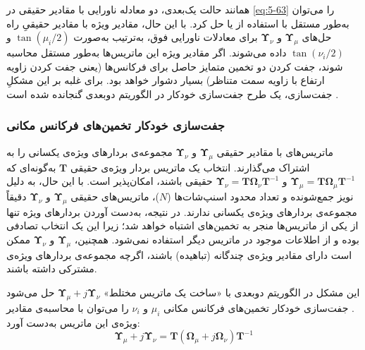 همانند حالت یک‌بعدی، دو معادله ناورایی با مقادیر حقیقی در \eqref{eq:5-63} را می‌توان به‌طور مستقل با استفاده از  یا  حل کرد. با این حال، مقادیر ویژه با مقادیر حقیقیِ راه حل‌های $\bm{\Upsilon}_{\mu}$ و $\bm{\Upsilon}_{\nu}$ برای معادلات ناورایی فوق، به‌ترتیب به‌صورت $\tan(\mu_i/2)$ و $\tan(\nu_i/2)$ داده می‌شوند. اگر مقادیر ویژه این ماتریس‌ها به‌طور مستقل محاسبه شوند، جفت کردن دو تخمین متمایز حاصل برای فرکانس‌ها (یعنی جفت کردن زاویه ارتفاع با زاویه سمت متناظر) بسیار دشوار خواهد بود. برای غلبه بر این مشکلِ جفت‌سازی، یک طرح جفت‌سازی خودکار در الگوریتم  دوبعدی گنجانده شده است \cite{5-9}.




\subsubsection{جفت‌سازی خودکار تخمین‌های فرکانس مکانی}
\label{subsubsec:5-5-2-4}
ماتریس‌های با مقادیر حقیقی $\bm{\Upsilon}_{\mu}$ و $\bm{\Upsilon}_{\nu}$ مجموعه‌ی بردارهای ویژه‌ی یکسانی را به اشتراک می‌گذارند. انتخاب یک ماتریس بردار ویژه‌ی حقیقی $\bm{T}$ به‌گونه‌ای که $\bm{\Upsilon}_{\mu} = \bm{T} \bm{\Omega}_{\mu} \bm{T}^{-1}$ و $\bm{\Upsilon}_{\nu} = \bm{T} \bm{\Omega}_{\nu} \bm{T}^{-1}$ حقیقی باشند، امکان‌پذیر است. با این حال، به دلیل نویز جمع‌شونده و تعداد محدود اسنپ‌شات‌ها ($N$)، ماتریس‌های حقیقی $\bm{\Upsilon}_{\mu}$ و $\bm{\Upsilon}_{\nu}$ دقیقاً مجموعه‌ی بردارهای ویژه‌ی یکسانی ندارند. در نتیجه، به‌دست آوردن بردارهای ویژه تنها از یکی از ماتریس‌ها منجر به تخمین‌های اشتباه خواهد شد؛ زیرا این یک انتخاب تصادفی بوده و از اطلاعات موجود در ماتریس دیگر استفاده نمی‌شود. همچنین، $\bm{\Upsilon}_{\mu}$ و $\bm{\Upsilon}_{\nu}$ ممکن است دارای مقادیر ویژه‌ی چندگانه (تباهیده) باشند، اگرچه مجموعه‌ی بردارهای ویژه‌ی مشترکی داشته باشند.

این مشکل در الگوریتم  دوبعدی با «ساخت یک ماتریس مختلط» $\bm{\Upsilon}_{\mu} + j \bm{\Upsilon}_{\nu}$ حل می‌شود \cite{5-9}. جفت‌سازی خودکار تخمین‌های فرکانس مکانی $\mu_i$ و $\nu_i$ را می‌توان با محاسبه‌ی مقادیر ویژه‌ی این ماتریس به‌دست آورد:
\begin{equation}
	\bm{\Upsilon}_{\mu} + j \bm{\Upsilon}_{\nu} = \bm{T} (\bm{\Omega}_{\mu} + j \bm{\Omega}_{\nu}) \bm{T}^{-1}
	\label{eq:5-66}
\end{equation}


